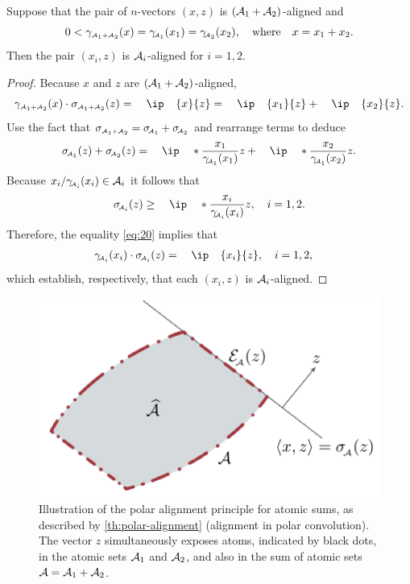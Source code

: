 \begin{theorem} \label{th:polar-alignment}
  Suppose that the pair of $n$-vectors $(x,z)$ is $(\mathcal{A}_1+\mathcal{A}_2)$-aligned
  and
  \[
    0<\gamma_{\scriptscriptstyle\mathcal{A}_1+\mathcal{A}_2}(x)
    = \gamma_{\!\scriptscriptstyle\mathcal{A}_1}(x_1) = \gamma_{\!\scriptscriptstyle\mathcal{A}_2}(x_2),
    \hbox{\quad where\quad} x=x_1+x_2.
  \]
  Then the pair $(x_i,z)$ is $\mathcal{A}_i$-aligned for $i=1,2$.
\end{theorem}

\begin{proof}
  Because $x$ and $z$ are $(\mathcal{A}_1+\mathcal{A}_2)$-aligned,
 \[
   \gauge\subAsum(x)\cdot\sigma\subAsum(z)
   = \ip{x}{z} = \ip{x_1}{z} + \ip{x_2}{z}.
 \]
 Use the fact that $\sigma_{\scriptscriptstyle\mathcal{A}_1+\mathcal{A}_2}=\sigma_{\!\scriptscriptstyle\mathcal{A}_1}+\sigma_{\!\scriptscriptstyle\mathcal{A}_2}$ and rearrange terms to deduce
 \begin{equation} \label{eq:20}
   \sigma\Aso(z)+\sigma\Ast(z) =
     \ip*{\frac{x_1}{\gauge\Aso(x_1)}}{z}
   + \ip*{\frac{x_2}{\gauge\Aso(x_2)}}{z}.
 \end{equation}
 Because $x_i/\gamma_{\!\scriptscriptstyle\mathcal{A}_i}(x_i)\in\mathcal{A}_i$ it follows that
 \[
   \sigma\Asi(z) \geq \ip*{\frac{x_i}{\gauge\Asi(x_i)}}{z},
   \quad i=1,2.
   \]
 Therefore, the equality \eqref{eq:20} implies that 
 \begin{align*}
   \gauge\Asi(x_i)\cdot\sigma\Asi(z) &= \ip{x_i}{z}, \quad i=1,2,
 \end{align*}
 which establish, respectively, that each $(x_i,z)$ is $\mathcal{A}_i$-aligned.
\end{proof}

\begin{figure}[t]
  \centering
  \includegraphics[page=9]{./figures/illustrations}
  \caption{Illustration of the polar alignment principle for atomic sums, as
    described by \autoref{th:polar-alignment} (alignment in polar convolution). The
    vector $z$ simultaneously exposes atoms, indicated by black dots, in the
    atomic sets $\mathcal{A}_1$ and $\mathcal{A}_2$, and also in the sum of atomic sets
    $\mathcal{A}=\mathcal{A}_1+\mathcal{A}_2$.}
  \label{figure-convolution}
\end{figure}

